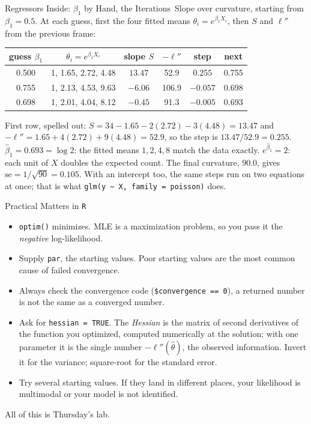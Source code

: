 \documentclass[aspectratio=169,11pt,xcolor=dvipsnames]{beamer}
\newcommand{\loglik}{\ell}
\newcommand{\SE}{\mathrm{se}}
\newcommand{\core}{\,\raisebox{0.6pt}{\textcolor{corestar}{$\bigstar$}}}
\begin{document}
\begin{frame}{Regressors Inside: $\beta_1$ by Hand, the Iterations\core}
Slope over curvature, starting from $\beta_1 = 0.5$. At each guess, first the
four fitted means $\theta_i = e^{\beta_1 X_i}$, then $S$ and $\loglik''$
from the previous frame:
\begin{center}
\renewcommand{\arraystretch}{1.15}
\begin{tabular}{cccccc}
\toprule
guess $\beta_1$ & $\theta_i = e^{\beta_1 X_i}$ & slope $S$ & $-\loglik''$ & step & next \\
\midrule
0.500 & 1, 1.65, 2.72, 4.48 & $13.47$ & 52.9  & $0.255$  & 0.755 \\
0.755 & 1, 2.13, 4.53, 9.63 & $-6.06$ & 106.9 & $-0.057$ & 0.698 \\
0.698 & 1, 2.01, 4.04, 8.12 & $-0.45$ & 91.3  & $-0.005$ & 0.693 \\
\bottomrule
\end{tabular}
\end{center}
\vskip2pt
First row, spelled out: $S = 34 - 1.65 - 2(2.72) - 3(4.48) = 13.47$ and
$-\loglik'' = 1.65 + 4(2.72) + 9(4.48) = 52.9$, so the step is
$13.47/52.9 = 0.255$.
\vskip4pt
$\hat\beta_1 = 0.693 = \log 2$: the fitted means $1, 2, 4, 8$ match the
data exactly. $e^{\hat\beta_1} = 2$: each unit of $X$ doubles the expected
count. The final curvature, $90.0$, gives $\SE = 1/\sqrt{90} = 0.105$. With
an intercept too, the same steps run on two equations at once; that is what
\texttt{glm(y \~{} X, family = poisson)} does.
\end{frame}

\begin{frame}{Practical Matters in \texttt{R}}
\begin{itemize}\itemsep4pt
  \item \texttt{optim()} \alert{minimizes}. MLE is a maximization problem, so you
        pass it the \emph{negative} log-likelihood.
  \item Supply \texttt{par}, the starting values. Poor starting values are the
        most common cause of failed convergence.
  \item Always check the convergence code (\texttt{\$convergence == 0}), a
        returned number is not the same as a converged number.
  \item Ask for \texttt{hessian = TRUE}. The \emph{Hessian} is the matrix
        of second derivatives of the function you optimized, computed
        numerically at the solution; with one parameter it is the single
        number $-\loglik''(\hat\theta)$, the observed information. Invert it
        for the variance; square-root for the standard error.
  \item Try several starting values. If they land in different places, your
        likelihood is multimodal or your model is not identified.
\end{itemize}
\vskip3pt
All of this is Thursday's lab.
\end{frame}
\end{document}
